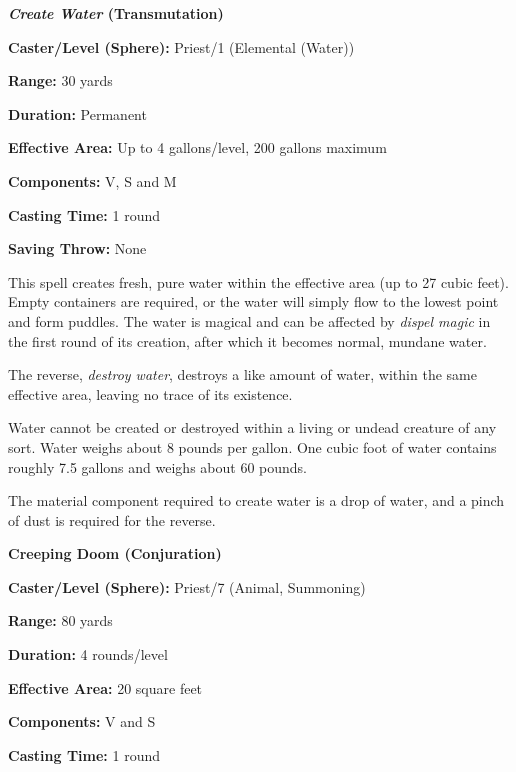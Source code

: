 \begin{multicols}{2}
\begin{minipage}{\columnwidth}
\noindent \textbf{\textit{Create Water} (Transmutation)}

\noindent \textbf{Caster/Level (Sphere):} Priest/1 (Elemental (Water))

\noindent \textbf{Range:} 30 yards

\noindent \textbf{Duration:} Permanent

\noindent \textbf{Effective Area:} Up to 4 gallons/level, 200 gallons maximum

\noindent \textbf{Components:} V, S and M

\noindent \textbf{Casting Time:} 1 round

\noindent \textbf{Saving Throw:} None

\end{minipage}

This spell creates fresh, pure water within the effective area (up to 27 cubic feet).  Empty containers are required, or the water will simply flow to the lowest point and form puddles.  The water is magical and can be affected by \textit{dispel magic} in the first round of its creation, after which it becomes normal, mundane water.  

The reverse, \textit{destroy water}, destroys a like amount of water, within the same effective area, leaving no trace of its existence.  

Water cannot be created or destroyed within a living or undead creature of any sort.  Water weighs about 8 pounds per gallon.  One cubic foot of water contains roughly 7.5 gallons and weighs about 60 pounds.

The material component required to create water is a drop of water, and a pinch of dust is required for the reverse.

\vspace{1em}

\noindent
\begin{minipage}{\columnwidth}

\noindent \textbf{Creeping Doom (Conjuration)}

\noindent \textbf{Caster/Level (Sphere):} Priest/7 (Animal, Summoning)

\noindent \textbf{Range:} 80 yards

\noindent \textbf{Duration:} 4 rounds/level

\noindent \textbf{Effective Area:} 20 square feet

\noindent \textbf{Components:} V and S

\noindent \textbf{Casting Time:} 1 round


\end{minipage}
\end{multicols}
